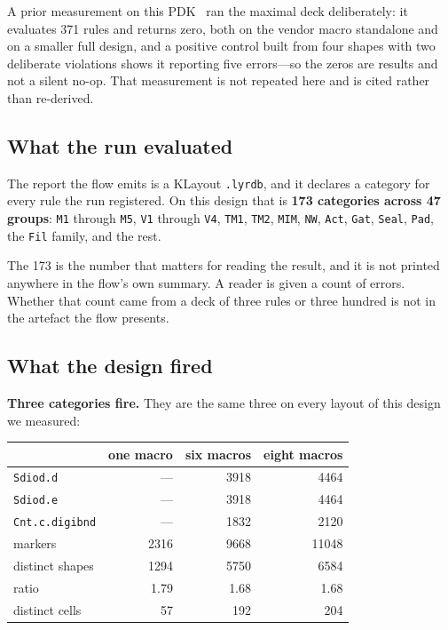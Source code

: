 \documentclass[11pt,a4paper]{article}
\newcommand{\file}[1]{\texttt{\small #1}}
\begin{document}
A prior measurement on this PDK~\cite{companion} ran the maximal deck
deliberately: it
evaluates \num{371} rules and returns zero, both on the vendor macro
standalone and on a smaller full design, and a positive control built
from four shapes with two deliberate violations shows it reporting five
errors---so the zeros are results and not a silent no-op. That
measurement is not repeated here and is cited rather than re-derived.

\subsection{What the run evaluated}

The report the flow emits is a KLayout \file{.lyrdb}, and it declares a
category for every rule the run registered. On this design that is
\textbf{\num{173} categories across \num{47} groups}: \texttt{M1} through
\texttt{M5}, \texttt{V1} through \texttt{V4}, \texttt{TM1}, \texttt{TM2},
\texttt{MIM}, \texttt{NW}, \texttt{Act}, \texttt{Gat}, \texttt{Seal},
\texttt{Pad}, the \texttt{Fil} family, and the rest.

The \num{173} is the number that matters for reading the result, and it
is not printed anywhere in the flow's own summary. A reader is given a
count of errors. Whether that count came from a deck of three rules or
three hundred is not in the artefact the flow presents.

\subsection{What the design fired}

\textbf{Three categories fire.} They are the same three on every layout
of this design we measured:

\begin{center}
\begin{tabular}{lrrr}
\toprule
& one macro & six macros & eight macros \\
\midrule
\texttt{Sdiod.d}       & --- & \num{3918} & \num{4464} \\
\texttt{Sdiod.e}       & --- & \num{3918} & \num{4464} \\
\texttt{Cnt.c.digibnd} & --- & \num{1832} & \num{2120} \\
\midrule
markers                & \num{2316} & \num{9668} & \num{11048} \\
distinct shapes        & \num{1294} & \num{5750} & \num{6584} \\
ratio                  & \num{1.79} & \num{1.68} & \num{1.68} \\
distinct cells         & \num{57}   & \num{192}  & \num{204} \\
\bottomrule
\end{tabular}
\end{center}
\end{document}
